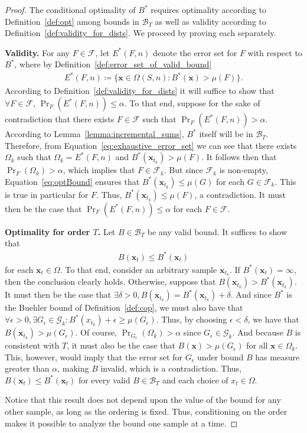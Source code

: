\documentclass[10pt,a4paper]{amsart}
\newcommand{\argmin}{\mathop{\rm argmin}}
\def\x{\mathbf{x}}
\begin{document}
\begin{proof}
The conditional optimality of $B^*$ requires optimality according to Definition~\ref{def:opt} among bounds in $\mathcal{B}_T$ as well as validity according to Definition~\ref{def:validity_for_dists}. We proceed by proving each separately.

{\bf Validity.} 
For any $F \in \mathcal{F}$, let $E^*(F, n)$ denote the error set for $F$ with respect to $B^*$, where by Definition~\ref{def:error_set_of_valid_bound}
\begin{eqnarray}
\label{eq:exhaustive_error_set}
    E^*(F,n) \coloneqq \{\x\in \Omega(S,n): B^*(\x) > \mu(F)\}.    
\end{eqnarray}
According to Definition~\ref{def:validity_for_dists} it will suffice to show that $\forall F \in \mathcal{F}$, $\Pr_F(E^*(F, n)) \leq \alpha$. 
To that end, suppose for the sake of contradiction that there exists $F \in \mathcal{F}$ such that $\Pr_F(E^*(F, n)) > \alpha$.
According to Lemma~\ref{lemma:incremental_sums}, $B^*$ itself will be in $\mathcal{B}_T$.
Therefore, from Equation~\ref{eq:exhaustive_error_set} we can see that there exists $\Omega_k$ such that $\Omega_k = E^*(F, n)$ and $B^*(\x_{t_k}) > \mu(F)$.
It follows then that $\Pr_F(\Omega_k) > \alpha$, which implies that $F \in \mathcal{F}_k$.
But since $\mathcal{F}_k$ is non-empty, Equation~\ref{eq:optBound} ensures that $B^*(\x_{t_k}) \leq \mu(G)$ for each $G \in \mathcal{F}_k$.
This is true in particular for $F$.
Thus, $B^*(\x_{t_k}) \leq \mu(F)$, a contradiction.
It must then be the case that $\Pr_F(E^*(F, n)) \leq \alpha$ for each $F \in \mathcal{F}$.
\color{black}
\medskip

{\bf Optimality for order $T$.}
Let $B \in \mathcal{B}_T$ be any valid bound. It suffices to show that 
\begin{eqnarray}
    B(\x_t) \leq B^*(\x_t)
\end{eqnarray}
for each $\x_t \in \Omega$. To that end, consider an arbitrary sample $\x_{t_k}$. If $B^*(\x_t) = \infty$, then the conclusion clearly holds. Otherwise, suppose that $B(\x_{t_k}) > B^*(\x_{t_k})$. It must then be the case that $\exists \delta > 0, B(\x_{t_k}) = B^*(\x_{t_k}) + \delta$.
And since $B^*$ is the Buehler bound of Definition~\ref{def:cop}, we must also have that $\forall \epsilon > 0, \exists G_\epsilon \in \mathcal{G}_k: B^*(x_{t_k}) + \epsilon \geq \mu(G_\epsilon)$.
Thus, by choosing $\epsilon < \delta$, we have that $B(\x_{t_k}) > \mu(G_\epsilon)$.
Of course, $\Pr_{G_\epsilon}(\Omega_k) > \alpha$ since $G_\epsilon \in \mathcal{G}_k$.
And because $B$ is consistent with $T$, it must also be the case that $B(\x) > \mu(G_\epsilon)$ for all $\x \in \Omega_k$.
This, however, would imply that the error set for $G_\epsilon$ under bound $B$ has measure greater than $\alpha$, making $B$ invalid, which is a contradiction. Thus, $B(\x_t) \leq B^*(\x_t)$ for every valid $B \in \mathcal{B}_T$ and each choice of $x_t \in \Omega$. 
\color{black}

Notice that this result does not depend upon the value of the bound for any other sample, as long as the ordering is fixed. Thus, conditioning on the order makes it possible to analyze the bound one sample at a time.
\end{proof}
\end{document}
